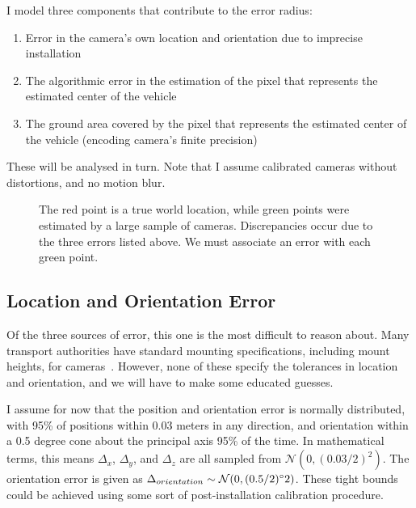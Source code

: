 \documentclass[a4paper,12pt,twoside,openright]{report}
\begin{document}
I model three components that contribute to the error radius:
\begin{enumerate}
    \item Error in the camera's own location and orientation due to imprecise installation
    \item The algorithmic error in the estimation of the pixel that represents the estimated center of the vehicle
    \item The ground area covered by the pixel that represents the estimated center of the vehicle (encoding camera's finite precision)
\end{enumerate}
 
These will be analysed in turn. Note that I assume calibrated cameras without distortions, and no motion blur.


\begin{figure}[htb]
    \begin{center}
        
    \end{center}
    \caption[Example Predictions about a World Point]{The red point is a true world location, while green points were
    estimated by a large sample of cameras. Discrepancies occur due to the three errors listed above. We must associate an error with each green point.}
    \label{fig:camera:dist}
\end{figure}



\subsection{Location and Orientation Error}

Of the three sources of error, this one is the most difficult to reason about. 
Many transport authorities have standard mounting specifications, including mount heights, for cameras~\cite{StreetscapeGuideance}.
However, none of these specify the tolerances in location and orientation, and we will have to make some educated guesses.

I assume for now that the position and orientation error is normally distributed, with
95\% of positions within 0.03 meters in any direction, 
and orientation within a 0.5 degree cone about the principal axis 95\% of the time.
In mathematical terms, this means $\Delta_{x}$, $\Delta_{y}$, and $\Delta_{z}$ 
are all sampled from $\mathcal{N}(0, (0.03/2)^2)$. The orientation error is given as
$\Delta_{orientation} \sim \mathcal{N}(0, (0.5/2)\degree2)$.
These tight bounds could be achieved using some sort of post-installation 
calibration procedure. 
\end{document}

